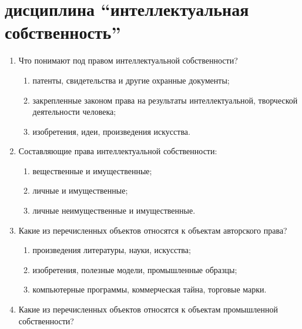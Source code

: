 

\usepackage{pifont}


\newcommand{\cmark}{\ding{51} }%



\Ukrainian

\section*{дисциплина “интеллектуальная собственность”}

\begin{enumerate}
    \item Что понимают под правом интеллектуальной собственности?
    \begin{enumerate}
        \item патенты, свидетельства и другие охранные документы;
        \item \cmark закрепленные законом права на результаты интеллектуальной, творческой деятельности человека;
        \item изобретения, идеи, произведения искусства.
    \end{enumerate}
    \item Составляющие права интеллектуальной собственности:
    \begin{enumerate}
        \item вещественные и имущественные;
        \item личные и имущественные;
        \item \cmark личные неимущественные и имущественные.
    \end{enumerate}
    \item Какие из перечисленных объектов относятся к объектам авторского права?
    \begin{enumerate}
        \item \cmark произведения литературы, науки, искусства;
        \item изобретения, полезные модели, промышленные образцы;
        \item компьютерные программы, коммерческая тайна, торговые марки.
    \end{enumerate}
    \item Какие из перечисленных объектов относятся к объектам промышленной собственности?

\end{enumerate}
